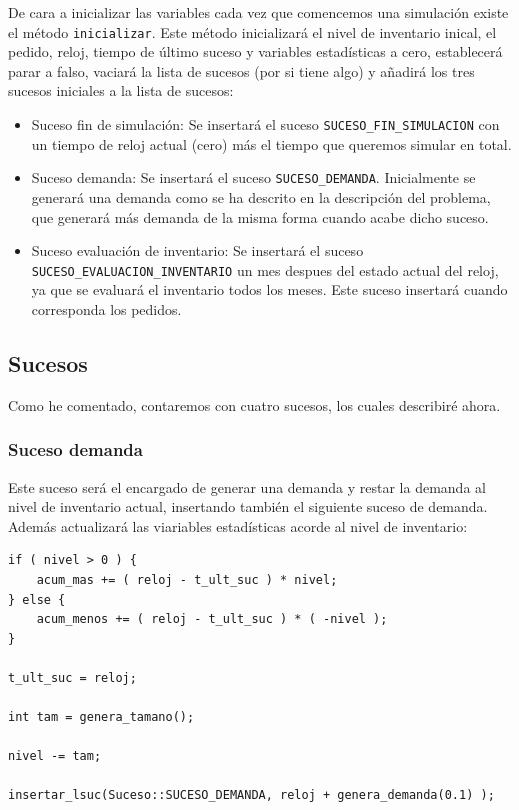 \documentclass[12pt, spanish]{article}
\begin{document}
De cara a inicializar las variables cada vez que comencemos una simulación existe el método \texttt{inicializar}. Este método inicializará el nivel de inventario inical, el pedido, reloj, tiempo de último suceso y variables estadísticas a cero, establecerá parar a falso, vaciará la lista de sucesos (por si tiene algo) y añadirá los tres sucesos iniciales a la lista de sucesos:

\begin{itemize}
	\item Suceso fin de simulación: Se insertará el suceso \texttt{SUCESO\_FIN\_SIMULACION} con un tiempo de reloj actual (cero) más el tiempo que queremos simular en total.
	\item Suceso demanda: Se insertará el suceso \texttt{SUCESO\_DEMANDA}. Inicialmente se generará una demanda como se ha descrito en la descripción del problema, que generará más demanda de la misma forma cuando acabe dicho suceso.
	\item Suceso evaluación de inventario: Se insertará el suceso \texttt{SUCESO\_EVALUACION\_INVENTARIO} un mes despues del estado actual del reloj, ya que se evaluará el inventario todos los meses. Este suceso insertará cuando corresponda los pedidos.
\end{itemize}

\subsection{Sucesos}

Como he comentado, contaremos con cuatro sucesos, los cuales describiré ahora.

\subsubsection{Suceso demanda}

Este suceso será el encargado de generar una demanda y restar la demanda al nivel de inventario actual, insertando también el siguiente suceso de demanda. Además actualizará las viariables estadísticas acorde al nivel de inventario:

\begin{lstlisting}
if ( nivel > 0 ) {
	acum_mas += ( reloj - t_ult_suc ) * nivel;
} else {
	acum_menos += ( reloj - t_ult_suc ) * ( -nivel );
}

t_ult_suc = reloj;

int tam = genera_tamano();

nivel -= tam;

insertar_lsuc(Suceso::SUCESO_DEMANDA, reloj + genera_demanda(0.1) );
\end{lstlisting}
\end{document}
